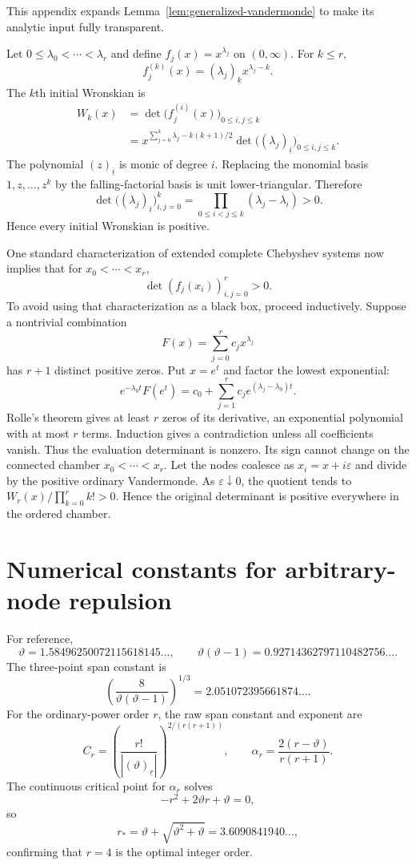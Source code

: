 \documentclass[11pt,oneside]{article}
\theoremstyle{definition}
\theoremstyle{remark}
\newcommand{\thetaq}{\vartheta}
\newcommand{\fall}[2]{\left(#1\right)_{\!\underline{#2}}}
\begin{document}
This appendix expands Lemma~\ref{lem:generalized-vandermonde} to make its analytic input fully
transparent.

Let $0\le\lambda_0<\cdots<\lambda_r$ and define
$f_j(x)=x^{\lambda_j}$ on $(0,\infty)$.  For $k\le r$,
\[
 f_j^{(k)}(x)=\fall{\lambda_j}{k}x^{\lambda_j-k}.
\]
The $k$th initial Wronskian is
\begin{align*}
 W_k(x)
 &=\det\bigl(f_j^{(i)}(x)\bigr)_{0\le i,j\le k}\\
 &=x^{\sum_{j=0}^{k}\lambda_j-k(k+1)/2}
   \det\bigl(\fall{\lambda_j}{i}\bigr)_{0\le i,j\le k}.
\end{align*}
The polynomial $\fall{z}{i}$ is monic of degree $i$.  Replacing the monomial basis
$1,z,\ldots,z^k$ by the falling-factorial basis is unit lower-triangular.  Therefore
\[
 \det\bigl(\fall{\lambda_j}{i}\bigr)_{i,j=0}^{k}
 =\prod_{0\le i<j\le k}(\lambda_j-\lambda_i)>0.
\]
Hence every initial Wronskian is positive.

One standard characterization of extended complete Chebyshev systems now implies that for
$x_0<\cdots<x_r$,
\[
 \det(f_j(x_i))_{i,j=0}^{r}>0.
\]
To avoid using that characterization as a black box, proceed inductively.  Suppose a nontrivial
combination
\[
 F(x)=\sum_{j=0}^{r}c_jx^{\lambda_j}
\]
has $r+1$ distinct positive zeros.  Put $x=e^t$ and factor the lowest exponential:
\[
 e^{-\lambda_0t}F(e^t)
 =c_0+\sum_{j=1}^{r}c_je^{(\lambda_j-\lambda_0)t}.
\]
Rolle's theorem gives at least $r$ zeros of its derivative, an exponential polynomial with at
most $r$ terms.  Induction gives a contradiction unless all coefficients vanish.  Thus the
evaluation determinant is nonzero.  Its sign cannot change on the connected chamber
$x_0<\cdots<x_r$.  Let the nodes coalesce as $x_i=x+i\varepsilon$ and divide by the positive
ordinary Vandermonde.  As $\varepsilon\downarrow0$, the quotient tends to
$W_r(x)/\prod_{k=0}^{r}k!>0$.  Hence the original determinant is positive everywhere in the
ordered chamber.

\section{Numerical constants for arbitrary-node repulsion}
\label{app:constants}

For reference,
\[
 \thetaq=1.58496250072115618145\ldots,
 \qquad
 \thetaq(\thetaq-1)=0.92714362797110482756\ldots.
\]
The three-point span constant is
\[
 \left(\frac{8}{\thetaq(\thetaq-1)}\right)^{1/3}
 =2.051072395661874\ldots.
\]
For the ordinary-power order $r$, the raw span constant and exponent are
\[
 C_r=\left(\frac{r!}{|\fall{\thetaq}{r}|}\right)^{2/(r(r+1))},
 \qquad
 \alpha_r=\frac{2(r-\thetaq)}{r(r+1)}.
\]
The continuous critical point for $\alpha_r$ solves
\[
 -r^2+2\thetaq r+\thetaq=0,
\]
so
\[
 r_*=\thetaq+\sqrt{\thetaq^2+\thetaq}=3.6090841940\ldots,
\]
confirming that $r=4$ is the optimal integer order.
\end{document}
